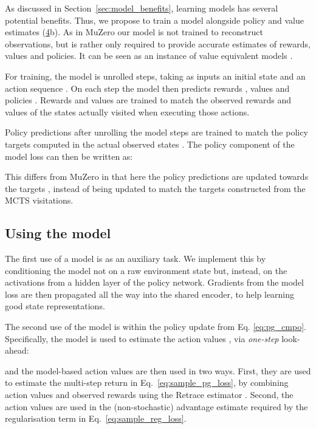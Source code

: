 \documentclass{article}
\newcommand{\desireModel}[1]{(\hyperref[table-desiderata]{4}#1)}
\begin{document}
\label{sec:model_training}
As discussed in Section~\ref{sec:model_benefits}, learning models has several potential benefits. Thus, we propose to train a model alongside policy and value estimates \desireModel{b}. As in MuZero \citep{schrittwieser2019} our model is not trained to reconstruct observations, but is rather only required to provide accurate estimates of rewards, values and policies. It can be seen as an instance of value equivalent models \citep{grimm2020value}. 

For training, the model is unrolled  steps, taking as inputs an initial state  and an action sequence . On each step the model then predicts rewards , values  and policies . Rewards and values are trained to match the observed rewards and values of the states actually visited when executing those actions. 

Policy predictions  after unrolling the model  steps are trained to match the  policy targets computed in the actual observed states . The policy component of the model loss can then be written as:

This differs from MuZero in that here the policy predictions  are updated towards the targets , instead of being updated to match the targets  constructed from the MCTS visitations.

\subsection{Using the model}\label{using-model}

The first use of a model is as an auxiliary task. We implement this by conditioning the model not on a raw environment state  but, instead, on the activations  from a hidden layer of the policy network. Gradients from the model loss  are then propagated all the way into the shared encoder, to help learning good state representations.

The second use of the model is within the policy update from Eq. \ref{eq:pg_cmpo}. Specifically, the model is used to estimate the action values , via \emph{one-step} look-ahead:

and the model-based action values are then used in two ways. First, they are used to estimate the multi-step return  in Eq.~\ref{eq:sample_pg_loss}, by combining action values and observed rewards using the Retrace estimator \cite{munos2016safe}. Second, the action values are used in the (non-stochastic) advantage estimate  required by the regularisation term in Eq.~\ref{eq:sample_reg_loss}. 
\end{document}
